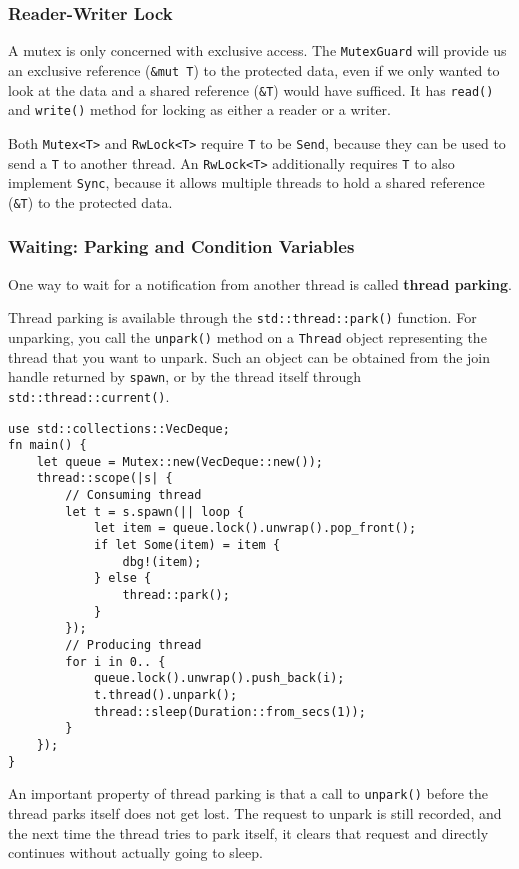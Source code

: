 \documentclass[11pt]{article}
\begin{document}
\subsubsection{Reader-Writer Lock}
\label{sec:org48d1db0}
A mutex is only concerned with exclusive access. The \texttt{MutexGuard} will provide us an exclusive
reference (\texttt{\&mut T}) to the protected data, even if we only wanted to look at the data and a
shared reference (\texttt{\&T}) would have sufficed. It has \texttt{read()} and \texttt{write()} method for locking as
either a reader or a writer.

Both \texttt{Mutex<T>} and \texttt{RwLock<T>} require \texttt{T} to be \texttt{Send}, because they can be used to send a \texttt{T} to
another thread. An \texttt{RwLock<T>} additionally requires \texttt{T} to also implement \texttt{Sync}, because it allows
multiple threads to hold a shared reference (\texttt{\&T}) to the protected data.
\subsubsection{Waiting: Parking and Condition Variables}
\label{sec:orgb1f0298}
One way to wait for a notification from another thread is called \textbf{thread parking}.

Thread parking is available through the \texttt{std::thread::park()} function. For unparking, you call
the \texttt{unpark()} method on a \texttt{Thread} object representing the thread that you want to unpark. Such an
object can be obtained from the join handle returned by \texttt{spawn}, or by the thread itself through
\texttt{std::thread::current()}.

\begin{verbatim}
use std::collections::VecDeque;
fn main() {
    let queue = Mutex::new(VecDeque::new());
    thread::scope(|s| {
        // Consuming thread
        let t = s.spawn(|| loop {
            let item = queue.lock().unwrap().pop_front();
            if let Some(item) = item {
                dbg!(item);
            } else {
                thread::park();
            }
        });
        // Producing thread
        for i in 0.. {
            queue.lock().unwrap().push_back(i);
            t.thread().unpark();
            thread::sleep(Duration::from_secs(1));
        }
    });
}
\end{verbatim}

An important property of thread parking is that a call to \texttt{unpark()} before the thread parks
itself does not get lost. The request to unpark is still recorded, and the next time
the thread tries to park itself, it clears that request and directly continues without
actually going to sleep.
\end{document}
